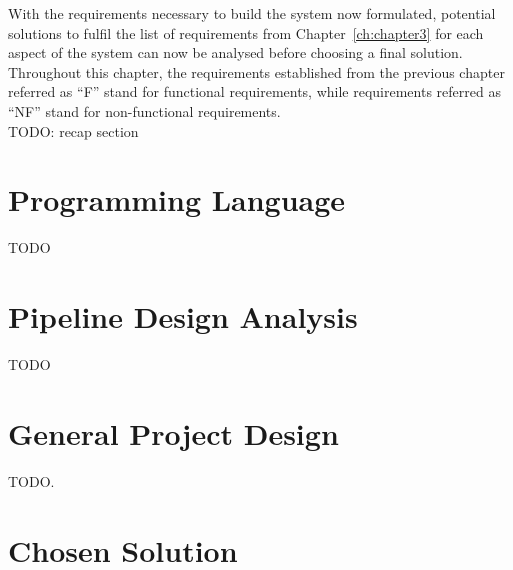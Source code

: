 With the requirements necessary to build the system now formulated, potential solutions to fulfil the list of requirements from Chapter~\ref{ch:chapter3} for each aspect of the system can now be analysed before choosing a final solution.\\

Throughout this chapter, the requirements established from the previous chapter referred as ``F'' stand for functional requirements, while requirements referred as ``NF'' stand for non-functional requirements.\\

TODO: recap section


\section{Programming Language}
\label{sec:design-programming-languages}

TODO


\section{Pipeline Design Analysis}

TODO



\section{General Project Design}

TODO.


\clearpage
\section{Chosen Solution}

